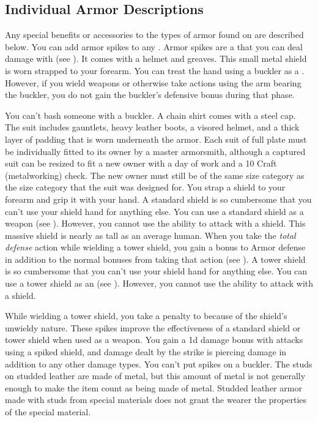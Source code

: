    \subsection{Individual Armor Descriptions}
        Any special benefits or accessories to the types of armor found on  are described below.
         You can add armor spikes to any .
        Armor spikes are a  that you can deal damage with (see ).
         It comes with a helmet and greaves.
         This small metal shield is worn strapped to your forearm.
        You can treat the hand using a buckler as a .
        However, if you wield weapons or otherwise take actions using the arm bearing the buckler, you do not gain the buckler's defensive bonus during that phase.
        \par You can't bash someone with a buckler.
         A chain shirt comes with a steel cap.
         The suit includes gauntlets, heavy leather boots, a visored helmet, and a thick layer of padding that is worn underneath the armor. Each suit of full plate must be individually fitted to its owner by a master armorsmith, although a captured suit can be resized to fit a new owner with a day of work and a  10 Craft (metalworking) check. The new owner must still be of the same size category as the size category that the suit was designed for.
         You strap a shield to your forearm and grip it with your hand.
        A standard shield is so cumbersome that you can't use your shield hand for anything else.
        You can use a standard shield as a weapon (see ).
        However, you cannot use the  ability to attack with a shield.
         This massive shield is nearly as tall as an average human.
        When you take the \textit{total defense} action while wielding a tower shield, you gain a  bonus to Armor defense in addition to the normal bonuses from taking that action (see ).
        A tower shield is so cumbersome that you can't use your shield hand for anything else.
        You can use a tower shield as an  (see ).
        However, you cannot use the  ability to attack with a shield.

        While wielding a tower shield, you take a  penalty to  because of the shield's unwieldy nature.
         These spikes improve the effectiveness of a standard shield or tower shield when used as a weapon.
        You gain a \plus1d damage bonus with attacks using a spiked shield, and damage dealt by the strike is piercing damage in addition to any other damage types.
        You can't put spikes on a buckler.
         The studs on studded leather are made of metal, but this amount of metal is not generally enough to make the item count as being made of metal.
        Studded leather armor made with studs from special materials does not grant the wearer the properties of the special material.

